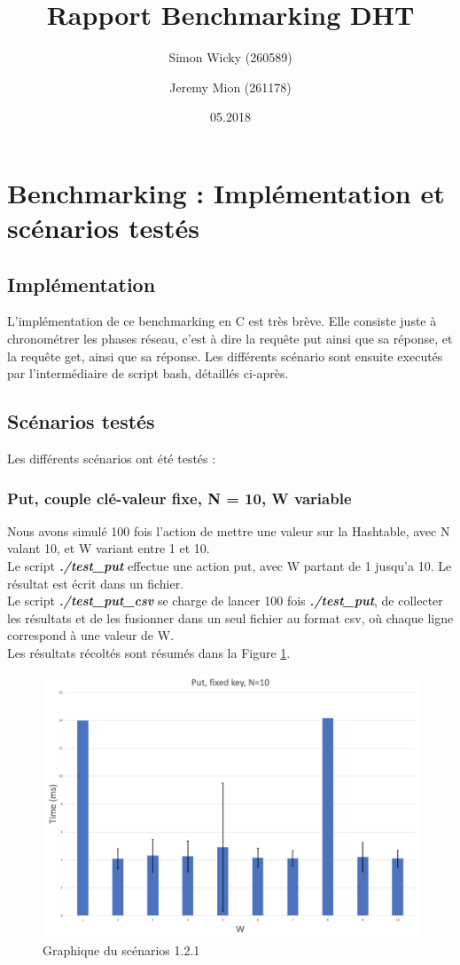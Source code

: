 \documentclass{article}
\author{Simon Wicky (260589) \and Jeremy Mion (261178)}
\title{Rapport Benchmarking DHT}
\date{05.2018}
\begin{document}
\maketitle
{}

\section{Benchmarking : Implémentation et scénarios testés}

\subsection{Implémentation}
L'implémentation de ce benchmarking en C est très brève. Elle consiste juste à chronométrer les phases réseau, c'est à dire la requête put ainsi que sa réponse, et la requête get, ainsi que sa réponse. Les différents scénario sont ensuite executés par l'intermédiaire de script bash, détaillés ci-après.

\subsection{Scénarios testés}
Les différents scénarios ont été testés :
\subsubsection{Put, couple clé-valeur fixe, N = 10, W variable}
Nous avons simulé 100 fois l'action de mettre une valeur sur la Hashtable, avec N valant 10, et W variant entre 1 et 10.\\
Le script \textbf{\textit{./test\_put}} effectue une action put, avec W partant de 1 jusqu'a 10. Le résultat est écrit dans un fichier. \\
Le script \textbf{\textit{./test\_put\_csv}} se charge de lancer 100 fois \textbf{\textit{./test\_put}}, de collecter les résultats et de les fusionner dans un seul fichier au format csv, où chaque ligne correspond à une valeur de W. \\
Les résultats récoltés sont résumés dans la Figure \ref{figPut}. 
\begin{figure}
 	\includegraphics[scale = 0.25]{img/Put}
 	\caption{Graphique du scénarios 1.2.1}
 	\label{figPut}
\end{figure}
\end{document}

